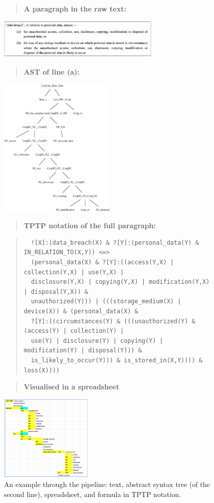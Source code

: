 \documentclass{IOS-Book-Article}
\newcommand{\bequ}{\begin{quote}}
\newcommand{\enqu}{\end{quote}}
\begin{document}
\begin{figure}
    \bequ
    \textbf{A paragraph in the raw text:}
    \enqu
    \includegraphics[width=0.7\textwidth]{text.png}

    \bequ
    \textbf{AST of line (a):}
    \enqu
    \includegraphics[width=0.5\textwidth]{tree.eps}
      \bequ
      \textbf{TPTP notation of the full paragraph:}
      \enqu
    \bequ
    \small
    \begin{verbatim}
  ![X]:(data_breach(X) & ?[Y]:(personal_data(Y) & IN_RELATION_TO(X,Y)) <=>
  (personal_data(X) & ?[Y]:((access(Y,X) | collection(Y,X) | use(Y,X) |
  disclosure(Y,X) | copying(Y,X) | modification(Y,X) | disposal(Y,X)) &
  unauthorized(Y))) | (((storage_medium(X) | device(X)) & (personal_data(X) &
  ?[Y]:((circumstances(Y) & (((unauthorized(Y) & (access(Y) | collection(Y) |
  use(Y) | disclosure(Y) | copying(Y) | modification(Y) | disposal(Y))) &
  is_likely_to_occur(Y))) & is_stored_in(X,Y)))) & loss(X))))
    \end{verbatim}
    \enqu

    \normalsize
    \bequ
    \textbf{Visualised in a spreadsheet}
    \enqu
    \includegraphics[width=0.4\textwidth]{assembly.png}
\caption{An example through the pipeline: text, abstract syntax tree (of the second line), spreadsheet, and formula in TPTP notation.}
\label{pipeline-ex}
\end{figure}
\end{document}
